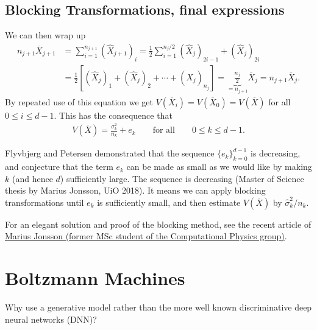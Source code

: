 \documentclass[%
oneside,                 %
final,                   %
10pt]{article}
\begin{document}
\subsection*{Blocking Transformations, final expressions}

We can then wrap up
\begin{align}
n_{j+1} \overline{X}_{j+1}  &= \sum_{i=1}^{n_{j+1}} (\hat{X}_{j+1})_i =  \frac{1}{2}\sum_{i=1}^{n_{j}/2} (\hat{X}_{j})_{2i-1} + (\hat{X}_{j})_{2i} \nonumber \\
&= \frac{1}{2}\left[ (\hat{X}_j)_1 + (\hat{X}_j)_2 + \cdots + (\hat{X}_j)_{n_j} \right] = \underbrace{\frac{n_j}{2}}_{=n_{j+1}} \overline{X}_j = n_{j+1}\overline{X}_j. 
\end{align}
By repeated use of this equation we get $V(\overline{X}_i) = V(\overline{X}_0) = V(\overline{X})$ for all $0 \leq i \leq d-1$. This has the consequence that
\begin{align}
V(\overline{X}) = \frac{\sigma_k^2}{n_k} + e_k \qquad \text{for all} \qquad 0 \leq k \leq d-1. \label{eq:convergence}
\end{align}

Flyvbjerg and Petersen demonstrated that the sequence
$\{e_k\}_{k=0}^{d-1}$ is decreasing, and conjecture that the term
$e_k$ can be made as small as we would like by making $k$ (and hence
$d$) sufficiently large. The sequence is decreasing (Master of Science thesis by Marius Jonsson, UiO 2018).
It means we can apply blocking transformations until
$e_k$ is sufficiently small, and then estimate $V(\overline{X})$ by
$\widehat{\sigma}^2_k/n_k$. 

For an elegant solution and proof of the blocking method, see the recent article of \href{{https://journals.aps.org/pre/abstract/10.1103/PhysRevE.98.043304}}{Marius Jonsson (former MSc student of the Computational Physics group)}.

\section*{Boltzmann Machines}

Why use a generative model rather than the more well known discriminative deep neural networks (DNN)? 
\end{document}
